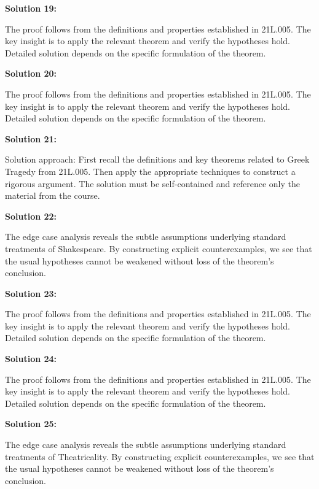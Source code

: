 \documentclass[12pt,a4paper]{exam}
\begin{document}
\vspace{0.5cm}

\textbf{Solution 19:}

The proof follows from the definitions and properties established in 21L.005. The key insight is to apply the relevant theorem and verify the hypotheses hold. Detailed solution depends on the specific formulation of the theorem.

\vspace{0.5cm}

\textbf{Solution 20:}

The proof follows from the definitions and properties established in 21L.005. The key insight is to apply the relevant theorem and verify the hypotheses hold. Detailed solution depends on the specific formulation of the theorem.

\vspace{0.5cm}

\textbf{Solution 21:}

Solution approach: First recall the definitions and key theorems related to Greek Tragedy from 21L.005. Then apply the appropriate techniques to construct a rigorous argument. The solution must be self-contained and reference only the material from the course.

\vspace{0.5cm}

\textbf{Solution 22:}

The edge case analysis reveals the subtle assumptions underlying standard treatments of Shakespeare. By constructing explicit counterexamples, we see that the usual hypotheses cannot be weakened without loss of the theorem's conclusion.

\vspace{0.5cm}

\textbf{Solution 23:}

The proof follows from the definitions and properties established in 21L.005. The key insight is to apply the relevant theorem and verify the hypotheses hold. Detailed solution depends on the specific formulation of the theorem.

\vspace{0.5cm}

\textbf{Solution 24:}

The proof follows from the definitions and properties established in 21L.005. The key insight is to apply the relevant theorem and verify the hypotheses hold. Detailed solution depends on the specific formulation of the theorem.

\vspace{0.5cm}

\textbf{Solution 25:}

The edge case analysis reveals the subtle assumptions underlying standard treatments of Theatricality. By constructing explicit counterexamples, we see that the usual hypotheses cannot be weakened without loss of the theorem's conclusion.

\vspace{0.5cm}
\end{document}
